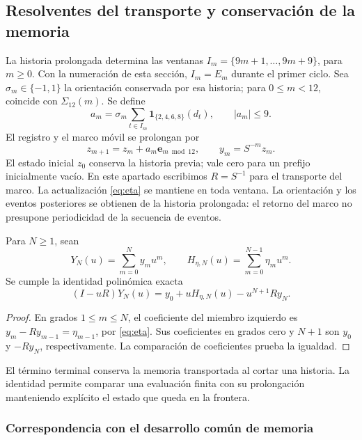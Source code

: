 \subsection{Resolventes del transporte y conservación de la memoria}
\label{subsec:ii-memoria-resolvente}

La historia prolongada determina las ventanas
\(I_m=\{9m+1,\ldots,9m+9\}\), para \(m\geq0\).
Con la numeración de esta sección, \(I_m=E_m\) durante el primer ciclo.
Sea \(\sigma_m\in\{-1,1\}\) la orientación conservada por esa historia;
para \(0\leq m<12\), coincide con \(\Sigma_{12}(m)\). Se define
\[
 a_m=\sigma_m\sum_{t\in I_m}\mathbf1_{\{2,4,6,8\}}(d_t),
 \qquad |a_m|\leq9.
\]
El registro y el marco móvil se prolongan por
\[
 z_{m+1}=z_m+a_m\mathbf e_{m\bmod12},\qquad y_m=S^{-m}z_m.
\]
El estado inicial \(z_0\) conserva la historia previa; vale cero para
un prefijo inicialmente vacío. En este apartado escribimos
\(R=S^{-1}\) para el transporte del marco. La actualización
\eqref{eq:eta} se mantiene en toda ventana. La orientación y los eventos
posteriores se obtienen de la historia prolongada: el retorno del marco
no presupone periodicidad de la secuencia de eventos.

\begin{proposition}
Para $N\geq1$, sean
\[
Y_N(u)=\sum_{m=0}^N y_mu^m,\qquad
H_{\eta,N}(u)=\sum_{m=0}^{N-1}\eta_mu^m.
\]
Se cumple la identidad polinómica exacta
\begin{equation}
(I-uR)Y_N(u)=y_0+uH_{\eta,N}(u)-u^{N+1}Ry_N.
\label{mem:identidad-finita}
\end{equation}
\end{proposition}
\begin{proof}
En grados $1\leq m\leq N$, el coeficiente del miembro izquierdo es
$y_m-Ry_{m-1}=\eta_{m-1}$, por \eqref{eq:eta}.
Sus coeficientes en grados cero y $N+1$ son $y_0$ y $-Ry_N$,
respectivamente. La comparación de coeficientes prueba la igualdad.
\end{proof}

El término terminal conserva la memoria transportada al cortar una historia.
La identidad permite comparar una evaluación finita con su prolongación
manteniendo explícito el estado que queda en la frontera.


\subsubsection{Correspondencia con el desarrollo común de memoria}

